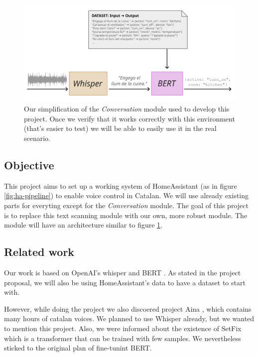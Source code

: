 \documentclass{article}
\begin{document}
\begin{figure}[H]
    \centering
    \includegraphics[width=0.8\linewidth]{drawing2.png}
    \caption{
    Our simplification of the \textit{Conversation} module used to develop this project. Once we verify that it works correctly with this environment (that's easier to test) we will be able to easily use it in the real scenario.
    }
    \label{fig:our-pipeline-real}
\end{figure}

\subsection{Objective}

This project aims to set up a working system of HomeAssistant (as in figure \ref{fig:ha-pipeline}) to enable voice control in Catalan. We will use already existing parts for everyting except for the \textit{Conversation} module. The goal of this project is to replace this text scanning module with our own, more robust module. The module will have an architecture similar to figure \ref{fig:our-pipeline-real}.

\subsection{Related work}

Our work is based on OpenAI's whisper \cite{whisper} and BERT \cite{Moradi2019survey}. As stated in the project proposal, we will also be using HomeAssistant's data \cite{homeassistant} to have a dataset to start with.

However, while doing the project we also discoered project Aina \cite{hernandezmena2024_3catparla}, which contains many hours of catalan voices. We planned to use Whisper already, but we wanted to mention this project. Also, we were informed about the existence of SetFix \cite{tunstall2022efficient} which is a transformer that can be
trained with few samples. We nevertheless sticked to the original plan of fine-tunint BERT.
\end{document}
